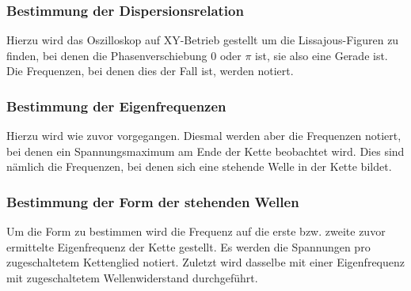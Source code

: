 \subsubsection{Bestimmung der Dispersionsrelation}
Hierzu wird das Oszilloskop auf XY-Betrieb gestellt um die Lissajous-Figuren zu finden, bei denen die Phasenverschiebung $0$ oder $\pi$ ist, sie also eine Gerade ist.
Die Frequenzen, bei denen dies der Fall ist, werden notiert.

\subsubsection{Bestimmung der Eigenfrequenzen}
Hierzu wird wie zuvor vorgegangen.
Diesmal werden aber die Frequenzen notiert, bei denen ein Spannungsmaximum am Ende der Kette beobachtet wird.
Dies sind nämlich die Frequenzen, bei denen sich eine stehende Welle in der Kette bildet.

\subsubsection{Bestimmung der Form der stehenden Wellen}
Um die Form zu bestimmen wird die Frequenz auf die erste bzw. zweite zuvor ermittelte Eigenfrequenz der Kette gestellt.
Es werden die Spannungen pro zugeschaltetem Kettenglied notiert.
Zuletzt wird dasselbe mit einer Eigenfrequenz mit zugeschaltetem Wellenwiderstand durchgeführt.
